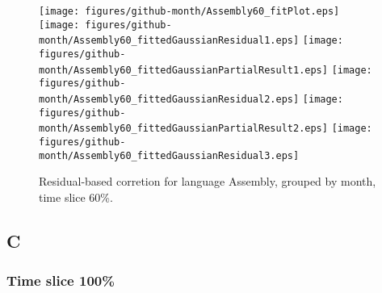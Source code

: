 \begin{figure}[t]
\centering
{}
{\texttt{[image: figures/github-month/Assembly60\_fitPlot.eps]}}
{\texttt{[image: figures/github-month/Assembly60\_fittedGaussianResidual1.eps]}}
{\texttt{[image: figures/github-month/Assembly60\_fittedGaussianPartialResult1.eps]}}
{\texttt{[image: figures/github-month/Assembly60\_fittedGaussianResidual2.eps]}}
{\texttt{[image: figures/github-month/Assembly60\_fittedGaussianPartialResult2.eps]}}
{\texttt{[image: figures/github-month/Assembly60\_fittedGaussianResidual3.eps]}}
\caption{Residual-based corretion for language Assembly, grouped by month, time slice 60\%.}
\end{figure}


\FloatBarrier


\subsection{C}

\subsubsection{Time slice 100\%}

